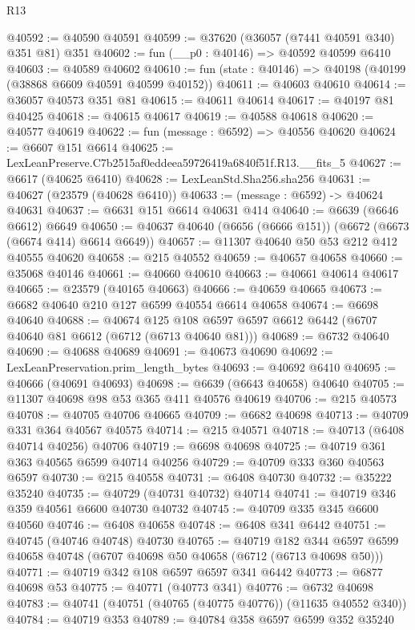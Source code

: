 \begin{lexlean}{R13}
\begin{coremodule}
@40592 := @40590 @40591
@40599 := @37620 (@36057 (@7441 @40591 @340) @351 @81) @351
@40602 := fun (__p0 : @40146) => @40592 @40599 @6410
@40603 := @40589 @40602
@40610 := fun (state : @40146) => @40198 (@40199 (@38868 @6609 @40591 @40599 @40152))
@40611 := @40603 @40610
@40614 := @36057 @40573 @351 @81
@40615 := @40611 @40614
@40617 := @40197 @81 @40425
@40618 := @40615 @40617
@40619 := @40588 @40618
@40620 := @40577 @40619
@40622 := fun (message : @6592) => @40556 @40620
@40624 := @6607 @151 @6614
@40625 := LexLeanPreserve.C7b2515af0eddeea59726419a6840f51f.R13.__fits_5
@40627 := @6617 (@40625 @6410)
@40628 := LexLeanStd.Sha256.sha256
@40631 := @40627 (@23579 (@40628 @6410))
@40633 := (message : @6592) -> @40624 @40631
@40637 := @6631 @151 @6614 @40631 @414
@40640 := @6639 (@6646 @6612) @6649
@40650 := @40637 @40640 (@6656 (@6666 @151)) (@6672 (@6673 (@6674 @414) @6614 @6649))
@40657 := @11307 @40640 @50 @53 @212 @412 @40555 @40620
@40658 := @215 @40552
@40659 := @40657 @40658
@40660 := @35068 @40146
@40661 := @40660 @40610
@40663 := @40661 @40614 @40617
@40665 := @23579 (@40165 @40663)
@40666 := @40659 @40665
@40673 := @6682 @40640 @210 @127 @6599 @40554 @6614 @40658
@40674 := @6698 @40640
@40688 := @40674
    @125
    @108
    @6597
    @6597
    @6612
    @6442
    (@6707 @40640 @81 @6612 (@6712 (@6713 @40640 @81)))
@40689 := @6732 @40640
@40690 := @40688 @40689
@40691 := @40673 @40690
@40692 := LexLeanPreservation.prim_length_bytes
@40693 := @40692 @6410
@40695 := @40666 (@40691 @40693)
@40698 := @6639 (@6643 @40658) @40640
@40705 := @11307 @40698 @98 @53 @365 @411 @40576 @40619
@40706 := @215 @40573
@40708 := @40705 @40706 @40665
@40709 := @6682 @40698
@40713 := @40709 @331 @364 @40567 @40575
@40714 := @215 @40571
@40718 := @40713 (@6408 @40714 @40256) @40706
@40719 := @6698 @40698
@40725 := @40719 @361 @363 @40565 @6599 @40714 @40256
@40729 := @40709 @333 @360 @40563 @6597
@40730 := @215 @40558
@40731 := @6408 @40730
@40732 := @35222 @35240
@40735 := @40729 (@40731 @40732) @40714
@40741 := @40719 @346 @359 @40561 @6600 @40730 @40732
@40745 := @40709 @335 @345 @6600 @40560
@40746 := @6408 @40658
@40748 := @6408 @341 @6442
@40751 := @40745 (@40746 @40748) @40730
@40765 := @40719
    @182
    @344
    @6597
    @6599
    @40658
    @40748
    (@6707 @40698 @50 @40658 (@6712 (@6713 @40698 @50)))
@40771 := @40719 @342 @108 @6597 @6597 @341 @6442
@40773 := @6877 @40698 @53
@40775 := @40771 (@40773 @341)
@40776 := @6732 @40698
@40783 := @40741 (@40751 (@40765 (@40775 @40776)) (@11635 @40552 @340))
@40784 := @40719 @353
@40789 := @40784 @358 @6597 @6599 @352 @35240

\end{coremodule}
\end{lexlean}
